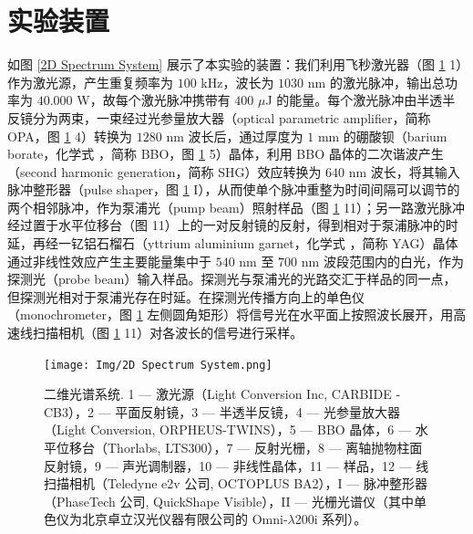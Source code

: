 \documentclass{thesis}
\begin{document}
\section{实验装置}
如图 \eqref{2D Spectrum System} 展示了本实验的装置：我们利用飞秒激光器（图 \ref{2D Spectrum System} \textcircled{\footnotesize{1}}）作为激光源，产生重复频率为 $100$ kHz，波长为 $1030$ nm 的激光脉冲，输出总功率为 $40.000$ W，故每个激光脉冲携带有 $400$ $\mu$J 的能量。每个激光脉冲由半透半反镜分为两束，一束经过光参量放大器（optical parametric amplifier，简称 OPA，图 \ref{2D Spectrum System} \textcircled{\footnotesize{4}}）转换为 $1280$ nm 波长后，通过厚度为 $1$ mm 的硼酸钡（barium borate，化学式 ，简称 BBO，图 \ref{2D Spectrum System} \textcircled{\footnotesize{5}}）晶体，利用 BBO 晶体的二次谐波产生（second harmonic generation，简称 SHG）效应转换为 $640$ nm 波长，将其输入脉冲整形器（pulse shaper，图 \ref{2D Spectrum System} I），从而使单个脉冲重整为时间间隔可以调节的两个相邻脉冲，作为泵浦光（pump beam）照射样品（图 \ref{2D Spectrum System} \textcircled{\footnotesize{11}}）；另一路激光脉冲经过置于水平位移台（图 \textcircled{\footnotesize{11}}）上的一对反射镜的反射，得到相对于泵浦脉冲的时延，再经一钇铝石榴石（yttrium aluminium garnet，化学式 ，简称 YAG）晶体通过非线性效应产生主要能量集中于 $540$ nm 至 $700$ nm 波段范围内的白光，作为探测光（probe beam）输入样品。探测光与泵浦光的光路交汇于样品的同一点，但探测光相对于泵浦光存在时延。在探测光传播方向上的单色仪（monochrometer，图 \ref{2D Spectrum System} 左侧圆角矩形）将信号光在水平面上按照波长展开，用高速线扫描相机（图 \ref{2D Spectrum System} \textcircled{\footnotesize{11}}）对各波长的信号进行采样。

\begin{figure}[h!]
    \centering
    \texttt{[image: Img/2D Spectrum System.png]}
    \caption{二维光谱系统. \textcircled{\footnotesize{1}} --- 激光源（Light Conversion Inc, CARBIDE - CB3），\textcircled{\footnotesize{2}} --- 平面反射镜，\textcircled{\footnotesize{3}} --- 半透半反镜，\textcircled{\footnotesize{4}} --- 光参量放大器（Light Conversion, ORPHEUS-TWINS），\textcircled{\footnotesize{5}} --- BBO 晶体，\textcircled{\footnotesize{6}} --- 水平位移台（Thorlabs, LTS300），\textcircled{\footnotesize{7}} --- 反射光栅，\textcircled{\footnotesize{8}} --- 离轴抛物柱面反射镜，\textcircled{\footnotesize{9}} --- 声光调制器，\textcircled{\footnotesize{10}} --- 非线性晶体，\textcircled{\footnotesize{11}} --- 样品，\textcircled{\footnotesize{12}} --- 线扫描相机（Teledyne e2v 公司, OCTOPLUS BA2），I --- 脉冲整形器（PhaseTech 公司, QuickShape Visible），II --- 光栅光谱仪（其中单色仪为北京卓立汉光仪器有限公司的 Omni-$\lambda$200i 系列）。}
    \label{2D Spectrum System}
\end{figure}
\end{document}
